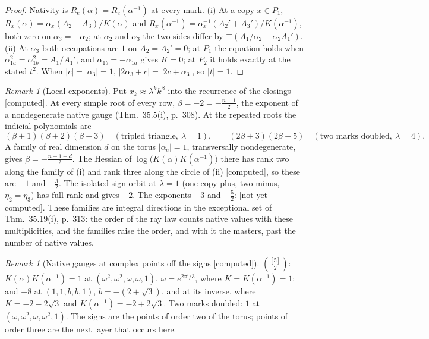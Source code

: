 \documentclass[11pt]{article}
\theoremstyle{plain}
\theoremstyle{definition}
\theoremstyle{remark}
\newtheorem{remark}[proposition]{Remark}
\newcommand{\computed}{\textup{[computed]}}
\newcommand{\notyet}{\textup{[not yet computed]}}
\begin{document}
\begin{proof}
Nativity is $R_e(\alpha)=R_e(\alpha^{-1})$ at every mark. (i) At a copy $x\in P_1$, $R_x(\alpha)=\alpha_x(A_2+A_3)/K(\alpha)$ and $R_x(\alpha^{-1})=\alpha_x^{-1}(A_2'+A_3')/K(\alpha^{-1})$, both zero on $\alpha_3=-\alpha_2$; at $\alpha_2$ and $\alpha_3$ the two sides differ by $\mp(A_1/\alpha_2-\alpha_2A_1')$. (ii) At $\alpha_3$ both occupations are $1$ on $A_2=A_2'=0$; at $P_1$ the equation holds when $\alpha_{1a}^2=\alpha_{1b}^2=A_1/A_1'$, and $\alpha_{1b}=-\alpha_{1a}$ gives $K=0$; at $P_2$ it holds exactly at the stated $t^2$. When $|c|=|\alpha_3|=1$, $|2\alpha_3+c|=|2c+\alpha_3|$, so $|t|=1$.
\end{proof}

\begin{remark}[Local exponents]
Put $x_k\approx\lambda^kk^\beta$ into the recurrence of the closings \computed. At every simple root of every row, $\beta=-2=-\frac{n-1}2$, the exponent of a nondegenerate native gauge (Thm.~35.5(i), p.~308). At the repeated roots the indicial polynomials are
\[
(\beta+1)(\beta+2)(\beta+3)\quad(\text{tripled triangle},\ \lambda=1),\qquad(2\beta+3)(2\beta+5)\quad(\text{two marks doubled},\ \lambda=4).
\]
A family of real dimension $d$ on the torus $|\alpha_e|=1$, transversally nondegenerate, gives $\beta=-\frac{n-1-d}2$. The Hessian of $\log\big(K(\alpha)K(\alpha^{-1})\big)$ there has rank two along the family of (i) and rank three along the circle of (ii) \computed, so these are $-1$ and $-\frac32$. The isolated sign orbit at $\lambda=1$ (one copy plus, two minus, $\eta_2=\eta_3$) has full rank and gives $-2$. The exponents $-3$ and $-\frac52$: \notyet. These families are integral directions in the exceptional set of Thm.~35.19(i), p.~313: the order of the ray law counts native values with these multiplicities, and the families raise the order, and with it the masters, past the number of native values.
\end{remark}

\begin{remark}[Native gauges at complex points off the signs \computed]
$\binom{[5]}2$: $K(\alpha)K(\alpha^{-1})=1$ at $(\omega^2,\omega^2,\omega,\omega,1)$, $\omega=e^{2\pi\mathrm i/3}$, where $K=K(\alpha^{-1})=1$; and $-8$ at $(1,1,b,b,1)$, $b=-(2+\sqrt3)$, and at its inverse, where $K=-2-2\sqrt3$ and $K(\alpha^{-1})=-2+2\sqrt3$. Two marks doubled: $1$ at $(\omega,\omega^2,\omega,\omega^2,1)$. The signs are the points of order two of the torus; points of order three are the next layer that occurs here.
\end{remark}
\end{document}

